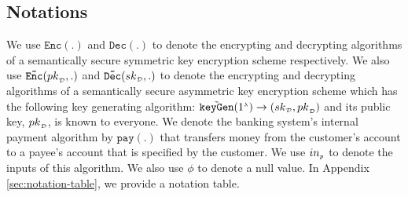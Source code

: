 \subsection{Notations}
We use $\mathtt{Enc}(.)$  and $\mathtt{Dec}(.)$ to denote the encrypting and decrypting algorithms of   a semantically secure symmetric key encryption scheme respectively. We also use  $\mathtt{ \tilde {Enc}}({pk}_{\scriptscriptstyle\mathcal {D}}, .)$ and   $\mathtt{\tilde{Dec}}({sk}_{\scriptscriptstyle\mathcal {D}}, .)$ to denote the encrypting and decrypting algorithms of   a semantically secure asymmetric key encryption scheme  which has  the following key generating algorithm:  $\tilde{\mathtt{keyGen}}(1^{\scriptscriptstyle\lambda})\rightarrow({sk}_{\scriptscriptstyle\mathcal {D}}, {pk}_{\scriptscriptstyle\mathcal {D}})$ and its  public key, ${pk}_{\scriptscriptstyle\mathcal {D}}$, is known to everyone.  We denote the banking system's internal payment  algorithm by  $\mathtt{pay}(.)$ that  transfers money from the customer's account to a payee's account that is specified by the customer.  We use $in_{\scriptscriptstyle p}$ to denote the inputs of this algorithm.  We also use $\phi$ to denote a null value. In Appendix \ref{sec:notation-table}, we provide a notation table. 







